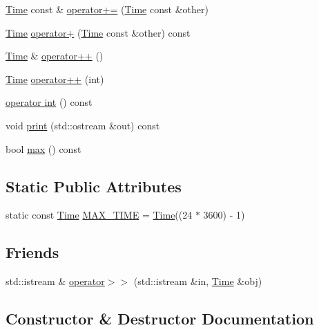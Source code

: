 \begin{DoxyCompactItemize}
\item 
\hyperlink{classTime}{Time} const  \& \hyperlink{classTime_a54a1d73b40abf9578a5d324d2805fdce}{operator+=} (\hyperlink{classTime}{Time} const \&other)
\item 
\hyperlink{classTime}{Time} \hyperlink{classTime_ace5e47a96c86c077b4e42b6713ae70de}{operator+} (\hyperlink{classTime}{Time} const \&other) const
\item 
\hyperlink{classTime}{Time} \& \hyperlink{classTime_a55e7ec82d5f390aa1896084e25a0f5a5}{operator++} ()
\item 
\hyperlink{classTime}{Time} \hyperlink{classTime_a9d672dbfc01b4d7f7d5789640017dc37}{operator++} (int)
\item 
\hyperlink{classTime_a7bc1d44c446e70740ab3f0dd64e457be}{operator int} () const
\item 
void \hyperlink{classTime_a2596ef53ebb188dc75b88160bd0aa230}{print} (std\+::ostream \&out) const
\item 
bool \hyperlink{classTime_a57f85c6b8295acdcf4e2f22ce7685170}{max} () const
\end{DoxyCompactItemize}
\subsection*{Static Public Attributes}
\begin{DoxyCompactItemize}
\item 
static const \hyperlink{classTime}{Time} \hyperlink{classTime_aeb625f84f2755479deac3ca3fd1d1cb4}{M\+A\+X\+\_\+\+T\+I\+ME} = \hyperlink{classTime}{Time}((24 $\ast$ 3600) -\/ 1)
\end{DoxyCompactItemize}
\subsection*{Friends}
\begin{DoxyCompactItemize}
\item 
std\+::istream \& \hyperlink{classTime_ae4ac864187eab9a6a954dd4213ec49fa}{operator$>$$>$} (std\+::istream \&in, \hyperlink{classTime}{Time} \&obj)
\end{DoxyCompactItemize}


\subsection{Constructor \& Destructor Documentation}
\mbox{\label{classTime_a393f1af1f9496b8833e3207f99325167}} 
